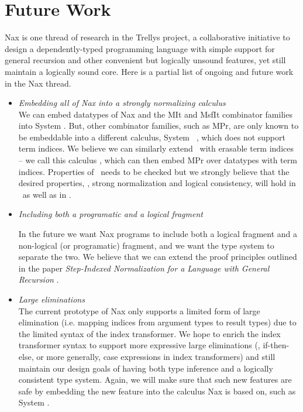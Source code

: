 \section{Future Work}


Nax is one thread of research in the Trellys project,
a collaborative initiative to design a
dependently-typed programming language with simple support for general recursion
and other convenient but logically unsound features, yet still maintain a
logically sound core. Here is a partial list of ongoing and future work in the Nax thread.

\begin{itemize}

\item \emph{Embedding all of Nax into a strongly normalizing calculus}\\
We can embed datatypes of Nax and the \textsf{MIt} and \textsf{MsfIt}
combinator families into System \Fi. But, other combinator families,
such as \textsf{MPr}, are only known to be embeddable into a different
calculus, System \Fixw\ \cite{AbeMat04}, which does not support term indices.
We believe we can similarly extend \Fixw\ with erasable term indices -- we call this
calculus \Fixi, which can then embed \textsf{MPr} over datatypes with term indices.
Properties of \Fixi\ needs to be checked but we strongly believe
that the desired properties, \ie, strong normalization
and logical consistency, will hold in \Fixi\ as well as in \Fi.

\item \emph{Including both a programatic and a logical fragment}

In the future we want Nax programs to include both a logical fragment
and a non-logical (or programatic) fragment, and we want the type system
to separate the two. We believe that we can extend the proof principles
outlined in the paper
\emph{Step-Indexed Normalization for a Language with General Recursion}
\cite{ccasin:msfp12}.


	
\item \emph{Large eliminations}\\
	The current prototype of Nax only supports a limited
	form of large elimination (i.e. mapping indices from
	argument types to result types) due to the limited syntax
	of the index transformer. We hope to enrich the index
	transformer syntax to support more expressive large eliminations
	(\eg, if-then-else, or more generally, case expressions
	in index transformers) and still maintain our design goals of
	having both type inference and a logically consistent type system.
	Again, we will make sure that such new features are safe by embedding
	the new feature into the calculus Nax is based on, such as System \Fi.


\end{itemize}

